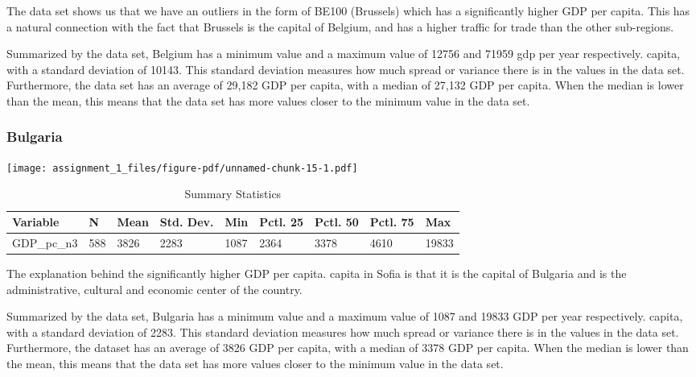 \documentclass[
  letterpaper,
  DIV=11,
  numbers=noendperiod]{scrartcl}
\begin{document}
The data set shows us that we have an outliers in the form of BE100
(Brussels) which has a significantly higher GDP per capita. This has a
natural connection with the fact that Brussels is the capital of
Belgium, and has a higher traffic for trade than the other sub-regions.

Summarized by the data set, Belgium has a minimum value and a maximum
value of 12756 and 71959 gdp per year respectively. capita, with a
standard deviation of 10143. This standard deviation measures how much
spread or variance there is in the values in the data set. Furthermore,
the data set has an average of 29,182 GDP per capita, with a median of
27,132 GDP per capita. When the median is lower than the mean, this
means that the data set has more values closer to the minimum value in
the data set.

\hypertarget{bulgaria}{%
\subsubsection{Bulgaria}\label{bulgaria}}

\texttt{[image: assignment\_1\_files/figure-pdf/unnamed-chunk-15-1.pdf]}

\begin{table}

\caption{Summary Statistics}
\centering
\begin{tabular}[t]{lllllllll}
\toprule
Variable & N & Mean & Std. Dev. & Min & Pctl. 25 & Pctl. 50 & Pctl. 75 & Max\\
\midrule
GDP_pc_n3 & 588 & 3826 & 2283 & 1087 & 2364 & 3378 & 4610 & 19833\\
\bottomrule
\end{tabular}
\end{table}

The explanation behind the significantly higher GDP per capita. capita
in Sofia is that it is the capital of Bulgaria and is the
administrative, cultural and economic center of the country.

Summarized by the data set, Bulgaria has a minimum value and a maximum
value of 1087 and 19833 GDP per year respectively. capita, with a
standard deviation of 2283. This standard deviation measures how much
spread or variance there is in the values in the data set. Furthermore,
the dataset has an average of 3826 GDP per capita, with a median of 3378
GDP per capita. When the median is lower than the mean, this means that
the data set has more values closer to the minimum value in the data
set.
\end{document}
